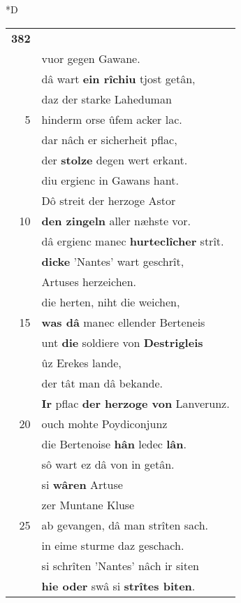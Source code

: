 \documentclass[8pt,a4paper,notitlepage]{article}
\begin{document}
\begin{table}[ht]
\begin{minipage}[t]{0.5\linewidth}
\small
\begin{center}*D
\end{center}
\begin{tabular}{rl}
\textbf{382} & \textbf{\begin{large}D\end{large}er grâve von der Muntane}\\ 
 & vuor gegen Gawane.\\ 
 & dâ wart \textbf{ein rîchiu} tjost getân,\\ 
 & daz der starke Laheduman\\ 
5 & hinderm orse ûfem acker lac.\\ 
 & dar nâch er sicherheit pflac,\\ 
 & der \textbf{stolze} degen wert erkant.\\ 
 & diu ergienc in Gawans hant.\\ 
 & Dô streit der herzoge Astor\\ 
10 & \textbf{den zingeln} aller næhste vor.\\ 
 & dâ ergienc manec \textbf{hurteclîcher} strît.\\ 
 & \textbf{dicke} 'Nantes' wart geschrît,\\ 
 & Artuses herzeichen.\\ 
 & die herten, niht die weichen,\\ 
15 & \textbf{was dâ} manec ellender Berteneis\\ 
 & unt \textbf{die} soldiere von \textbf{Destrigleis}\\ 
 & ûz Erekes lande,\\ 
 & der tât man dâ bekande.\\ 
 & \textbf{Ir} pflac \textbf{der herzoge von} Lanverunz.\\ 
20 & ouch mohte Poydiconjunz\\ 
 & die Bertenoise \textbf{hân} ledec \textbf{lân}.\\ 
 & sô wart ez dâ von in getân.\\ 
 & si \textbf{wâren} Artuse\\ 
 & zer Muntane Kluse\\ 
25 & ab gevangen, dâ man strîten sach.\\ 
 & in eime sturme daz geschach.\\ 
 & si schrîten 'Nantes' nâch ir siten\\ 
 & \textbf{hie oder} swâ si \textbf{strîtes biten}.\\ 

\end{tabular}
\end{minipage}
\end{table}
\end{document}
